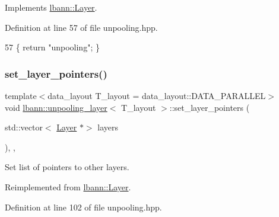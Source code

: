 Implements \hyperlink{classlbann_1_1Layer_a0fa0ea9160b490c151c0a17fde4f7239}{lbann\+::\+Layer}.



Definition at line 57 of file unpooling.\+hpp.


\begin{DoxyCode}
57 \{ \textcolor{keywordflow}{return} \textcolor{stringliteral}{"unpooling"}; \}
\end{DoxyCode}
\mbox{\label{classlbann_1_1unpooling__layer_aacc3a2fdd75ecee8614a00a85697a763}} 
\subsubsection{\texorpdfstring{set\+\_\+layer\+\_\+pointers()}{set\_layer\_pointers()}}
{\footnotesize\ttfamily template$<$data\+\_\+layout T\+\_\+layout = data\+\_\+layout\+::\+D\+A\+T\+A\+\_\+\+P\+A\+R\+A\+L\+L\+EL$>$ \\
void \hyperlink{classlbann_1_1unpooling__layer}{lbann\+::unpooling\+\_\+layer}$<$ T\+\_\+layout $>$\+::set\+\_\+layer\+\_\+pointers (\begin{DoxyParamCaption}\item[{std\+::vector$<$ \hyperlink{classlbann_1_1Layer}{Layer} $\ast$$>$}]{layers }\end{DoxyParamCaption})\hspace{0.3cm}{\ttfamily [inline]}, {\ttfamily [override]}, {\ttfamily [virtual]}}

Set list of pointers to other layers. 

Reimplemented from \hyperlink{classlbann_1_1Layer_a001ea76cdd05e2d0d475f408f24702ee}{lbann\+::\+Layer}.



Definition at line 102 of file unpooling.\+hpp.


